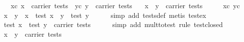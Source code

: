 \begin{isabellebody}
\ \ \ xc{}\ {}x\ {}\ carrier\ tests{}\ \ yc{}\ {}y\ {}\ carrier\ tests{}\isanewline
\ \ \ {}x\ {}\ y\ {}\ carrier\ tests{}\isanewline
%
\isadelimproof
%
\endisadelimproof
%
\isatagproof
{}\isamarkupfalse%
\ {}\isanewline
\ \ \isamarkupfalse%
\ xc\ yc\ \isamarkupfalse%
\ x{}\ \ y{}\ \ {}x\ {}\ test\ x{}{}\ \ {}y\ {}\ test\ y{}{}\isanewline
\ \ \ \ \isamarkupfalse%
\ {}simp\ add{}\ tests{}def{}\ metis\ test{}ex{}\isanewline
\ \ \isamarkupfalse%
\ \isamarkupfalse%
\ {}test\ x{}\ {}\ test\ y{}\ {}\ carrier\ tests{}\isanewline
\ \ \ \ \isamarkupfalse%
\ {}simp\ add{}\ mult{}to{}test{}\ rule\ test{}closed{}\isanewline
\ \ \isamarkupfalse%
\ \isamarkupfalse%
\ {}x\ {}\ y\ {}\ carrier\ tests{}\isanewline
\ \ \ \ \isamarkupfalse%

\end{isabellebody}
